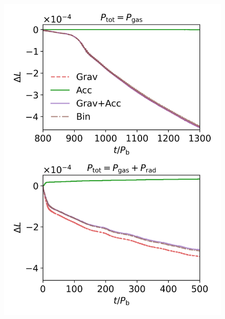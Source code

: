 \documentclass{aa}
\begin{document}
\begin{figure}[h]
    \begin{center}
    \label{} 
    \includegraphics[width=\columnwidth]{Fig/Results/AngMom_Pgas_zoom.png} \\   
    \caption{}
    \end{center}
\end{figure}
\end{document}
